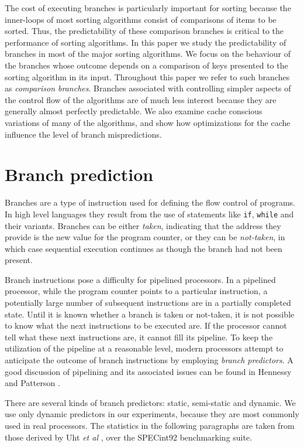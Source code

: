 \documentclass[acmtocl]{acmtrans2m}
\begin{document}
The cost of executing branches is particularly important for sorting because the
inner-loops of most sorting algorithms consist of comparisons of items to be
sorted. Thus, the predictability of these comparison branches is critical to the
performance of sorting algorithms. In this paper we study the predictability of
branches in most of the major sorting algorithms.  We focus on the behaviour of
the branches whose outcome depends on a comparison of keys presented to the
sorting algorithm in its input. Throughout this paper we refer to such branches
as \textit{comparison branches}. Branches associated with controlling simpler
aspects of the control flow of the algorithms are of much less interest because
they are generally almost perfectly predictable.  We also examine cache
conscious variations of many of the algorithms, and show how optimizations for
the cache influence the level of branch mispredictions.

\section{Branch prediction}
\label{branch_prediction}

Branches are a type of instruction used for defining the flow control of
programs. In high level languages they result from the use of statements like
\texttt{if}, \texttt{while} and their variants. Branches can be either
\textit{taken}, indicating that the address they provide is the new value for
the program counter, or they can be \textit{not-taken}, in which case sequential
execution continues as though the branch had not been present.

Branch instructions pose a difficulty for pipelined processors. In a pipelined
processor, while the program counter points to a particular instruction, a
potentially large number of subsequent instructions are in a partially completed
state.  Until it is known whether a branch is taken or not-taken, it is not
possible to know what the next instructions to be executed are.  If the
processor cannot tell what these next instructions are, it cannot fill its
pipeline.  To keep the utilization of the pipeline at a reasonable level, modern
processors attempt to anticipate the outcome of branch instructions by employing
\textit{branch predictors}. A good discussion of pipelining and its associated
issues can be found in Hennessy and Patterson \citeyear{HennessyPatterson90}.
 
There are several kinds of branch predictors: static, semi-static and dynamic.
We use only dynamic predictors in our experiments, because they are most
commonly used in real processors. The statistics in the following paragraphs are
taken from those derived by Uht \textit{et al} \citeyear{Uht+97}, over the
SPECint92 benchmarking suite. 
\end{document}
